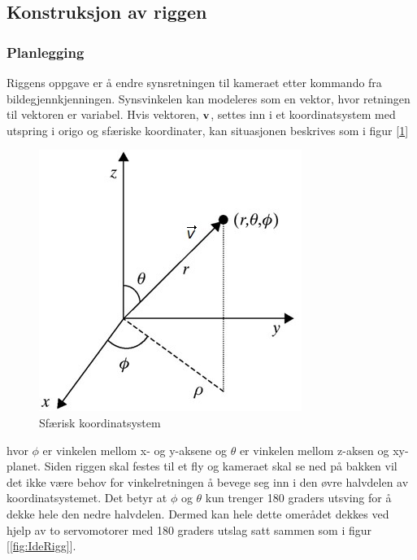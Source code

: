 \subsection{Konstruksjon av riggen}

\subsubsection{Planlegging}
Riggens oppgave er å endre synsretningen til kameraet etter kommando fra bildegjennkjenningen. Synsvinkelen kan modeleres som en vektor, hvor retningen til vektoren er variabel. Hvis vektoren, $\bf{v}$, settes inn i et koordinatsystem med utspring i origo og sfæriske koordinater, kan situasjonen beskrives som i figur [\ref{fig:spher}]

\begin{figure}[h!]
	\centering
	\includegraphics[scale=0.5]{img/RettVek.jpg}
	\caption{Sfærisk koordinatsystem}
	\label{fig:spher}
\end{figure}

hvor $\phi$ er vinkelen mellom x- og y-aksene og $\theta$ er vinkelen mellom z-aksen og xy-planet. Siden riggen skal festes til et fly og kameraet skal se ned på bakken vil det ikke være behov for vinkelretningen å bevege seg inn i den øvre halvdelen av koordinatsystemet. Det betyr at $\phi$ og $\theta$ kun trenger 180 graders utsving for å dekke hele den nedre halvdelen. Dermed kan hele dette omerådet dekkes ved hjelp av to servomotorer med 180 graders utslag satt sammen som i figur [\ref{fig:IdeRigg}]. 

